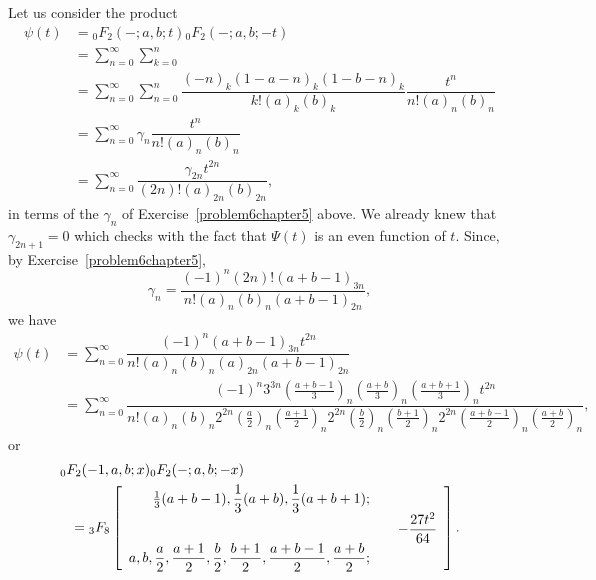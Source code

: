 \begin{solution}
Let us consider the product
$$\begin{array}{ll}
\psi(t) &= {}_0F_2(-;a,b;t) {}_0F_2(-;a,b;-t) \\
&= \displaystyle\sum_{n=0}^{\infty} \displaystyle\sum_{k=0}^n \\
&= \displaystyle\sum_{n=0}^{\infty} \displaystyle\sum_{n=0}^n \dfrac{(-n)_k (1-a-n)_k (1-b-n)_k}{k! (a)_k (b)_k} \dfrac{t^n}{n! (a)_n (b)_n} \\
&= \displaystyle\sum_{n=0}^{\infty} \gamma_n \dfrac{t^n}{n! (a)_n (b)_n} \\
&= \displaystyle\sum_{n=0}^{\infty} \dfrac{\gamma_{2n} t^{2n}}{(2n)! (a)_{2n} (b)_{2n}},
\end{array}$$
in terms of the $\gamma_n$ of Exercise~\ref{problem6chapter5} above. We already knew that $\gamma_{2n+1}=0$ which checks with the fact that $\Psi(t)$ is an even function of $t$.
Since, by Exercise~\ref{problem6chapter5},
$$\gamma_n = \dfrac{(-1)^n(2n)!(a+b-1)_{3n}}{n!(a)_n(b)_n(a+b-1)_{2n}},$$
we have
$$\begin{array}{ll}
\psi(t) &= \displaystyle\sum_{n=0}^{\infty} \dfrac{(-1)^n(a+b-1)_{3n}t^{2n}}{n! (a)_n (b)_n (a)_{2n} (a+b-1)_{2n}} \\
&= \displaystyle\sum_{n=0}^{\infty} \dfrac{(-1)^n 3^{3n} \left(\frac{a+b-1}{3} \right)_n \left( \frac{a+b}{3} \right)_n \left( \frac{a+b+1}{3} \right)_n t^{2n}}{n! (a)_n (b)_n 2^{2n} \left( \frac{a}{2} \right)_n \left( \frac{a+1}{2} \right)_n 2^{2n} \left( \frac{b}{2} \right)_n \left( \frac{b+1}{2} \right)_n 2^{2n} \left( \frac{a+b-1}{2} \right)_n \left( \frac{a+b}{2} \right)_n},
\end{array}$$
or
\begin{eqnarray*}
\lefteqn{{}_0F_2(-1,a,b;x){}_0F_2(-;a,b;-x)} \\
& & = {}_3F_8 \left[ \begin{array}{rlr}
\frac{1}{3} (a+b-1), \dfrac{1}{3}(a+b), \dfrac{1}{3} (a+b+1) ; & & \\
& & -\dfrac{27t^2}{64} \\
a,b, \dfrac{a}{2}, \dfrac{a+1}{2},\dfrac{b}{2}, \dfrac{b+1}{2}, \dfrac{a+b-1}{2}, \dfrac{a+b}{2}; & & 
\end{array} \right].
\end{eqnarray*}
\end{solution}
